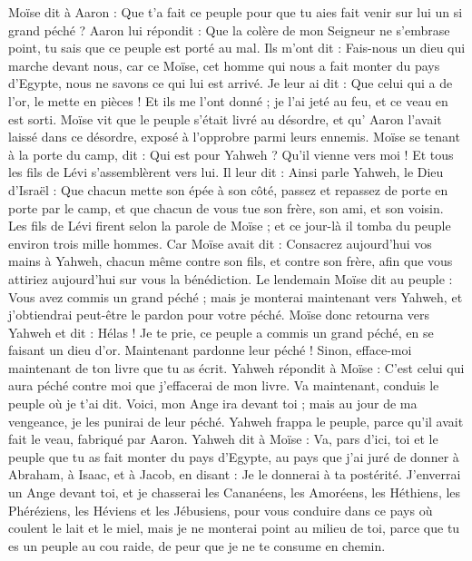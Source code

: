 \begin{multicols}{2}
Moïse dit à Aaron : Que t'a fait ce peuple pour que tu aies fait venir sur lui un si grand péché ?
Aaron lui répondit : Que la colère de mon Seigneur ne s'embrase point, tu sais que ce peuple est porté au mal.
Ils m'ont dit : Fais-nous un dieu qui marche devant nous, car ce Moïse, cet homme qui nous a fait monter du pays d'Egypte, nous ne savons ce qui lui est arrivé.
Je leur ai dit : Que celui qui a de l'or, le mette en pièces ! Et ils me l'ont donné ; je l'ai jeté au feu, et ce veau en est sorti.
Moïse vit que le peuple s’était livré au désordre, et qu’ Aaron l'avait laissé dans ce désordre, exposé à l’opprobre parmi leurs ennemis.
Moïse se tenant à la porte du camp, dit : Qui est pour Yahweh ? Qu'il vienne vers moi ! Et tous les fils de Lévi s'assemblèrent vers lui.
Il leur dit : Ainsi parle Yahweh, le Dieu d'Israël : Que chacun mette son épée à son côté, passez et repassez de porte en porte par le camp, et que chacun de vous tue son frère, son ami, et son voisin.
Les fils de Lévi firent selon la parole de Moïse ; et ce jour-là il tomba du peuple environ trois mille hommes.
Car Moïse avait dit : Consacrez aujourd'hui vos mains à Yahweh, chacun même contre son fils, et contre son frère, afin que vous attiriez aujourd'hui sur vous la bénédiction.
Le lendemain Moïse dit au peuple : Vous avez commis un grand péché ; mais je monterai maintenant vers Yahweh, et j’obtiendrai peut-être le pardon pour votre péché.
Moïse donc retourna vers Yahweh et dit : Hélas ! Je te prie, ce peuple a commis un grand péché, en se faisant un dieu d'or.
Maintenant pardonne leur péché ! Sinon, efface-moi maintenant de ton livre que tu as écrit.
Yahweh répondit à Moïse : C’est celui qui aura péché contre moi que j’effacerai de mon livre.
Va maintenant, conduis le peuple où je t’ai dit. Voici, mon Ange ira devant toi ; mais au jour de ma vengeance, je les punirai de leur péché.
Yahweh frappa le peuple, parce qu'il avait fait le veau, fabriqué par Aaron.
\VerseOne{}Yahweh dit à Moïse : Va, pars d'ici, toi et le peuple que tu as fait monter du pays d'Egypte, au pays que j'ai juré de donner à Abraham, à Isaac, et à Jacob, en disant : Je le donnerai à ta postérité.
J'enverrai un Ange devant toi, et je chasserai les Cananéens, les Amoréens, les Héthiens, les Phéréziens, les Héviens et les Jébusiens,
pour vous conduire dans ce pays où coulent le lait et le miel, mais je ne monterai point au milieu de toi, parce que tu es un peuple au cou raide, de peur que je ne te consume en chemin.

\end{multicols}
